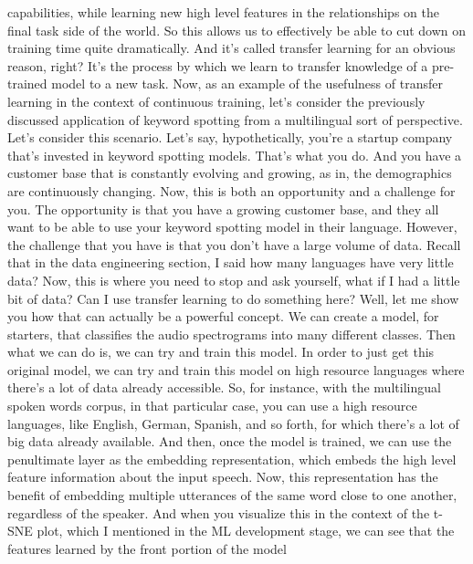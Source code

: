 {{{{    capabilities, while learning new high level features in the relationships
    on the final task side of the world.
    So this allows us to effectively be able to cut down on training time
    quite dramatically.
    And it's called transfer learning for an obvious reason, right?
    It's the process by which we learn to transfer knowledge
    of a pre-trained model to a new task.
    Now, as an example of the usefulness of transfer
    learning in the context of continuous training,
    let's consider the previously discussed application
    of keyword spotting from a multilingual sort of perspective.
    Let's consider this scenario.
    Let's say, hypothetically, you're a startup company that's
    invested in keyword spotting models.
    That's what you do.
    And you have a customer base that is constantly evolving and growing,
    as in, the demographics are continuously changing.
    Now, this is both an opportunity and a challenge for you.
    The opportunity is that you have a growing customer base,
    and they all want to be able to use your keyword spotting model
    in their language.
    However, the challenge that you have is that you
    don't have a large volume of data.
    Recall that in the data engineering section,
    I said how many languages have very little data?
    Now, this is where you need to stop and ask yourself,
    what if I had a little bit of data?
    Can I use transfer learning to do something here?
    Well, let me show you how that can actually be a powerful concept.
    We can create a model, for starters, that classifies the audio spectrograms
    into many different classes.
    Then what we can do is, we can try and train this model.
    In order to just get this original model,
    we can try and train this model on high resource languages
    where there's a lot of data already accessible.
    So, for instance, with the multilingual spoken words corpus,
    in that particular case, you can use a high resource languages,
    like English, German, Spanish, and so forth,
    for which there's a lot of big data already available.
    And then, once the model is trained, we can use the penultimate layer
    as the embedding representation, which embeds the high level feature
    information about the input speech.
    Now, this representation has the benefit of embedding
    multiple utterances of the same word close to one another,
    regardless of the speaker.
    And when you visualize this in the context of the t-SNE plot, which
    I mentioned in the ML development stage, we
    can see that the features learned by the front portion of the model
}}}}
